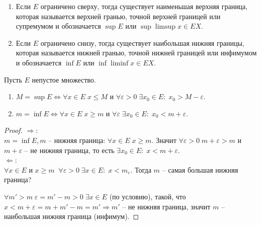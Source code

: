\begin{Definition}
\begin{enumerate}
\item Если $E$ ограничено сверху, тогда существует наименьшая верхняя граница, которая называется верхней гранью, точной верхней границей или супремумом и обозначается $\sup E$ или $\sup\limsup{x\in E}X.$
\item Если $E$ ограничено снизу, тогда существует наибольшая нижняя границы, которая называется нижней гранью, точной нижней границей или инфимумом и обозначается $\inf E$ или $\inf\liminf{x\in E}X.$
\end{enumerate}
\end{Definition}

\begin{Theorem}
Пусть $E$ непустое множество. 
\begin{enumerate}
\item $M=\sup E \Leftrightarrow \forall x\in E\; x\leq M$ и $\forall\varepsilon>0\; \exists x_0\in E: \; x_0>M-\varepsilon.$
\item $m=\inf E \Leftrightarrow \forall x\in E \; x\geq m$ и $\forall\varepsilon\; \exists x_0\in E: \; x_0<m+\varepsilon.$
\end{enumerate}
\end{Theorem}
\begin{proof}
$\Rightarrow:$\\
$m=\inf E, m$ -- нижняя граница: $\forall x\in E\; x\geq m.$ Значит $\forall\varepsilon>0\; m+\varepsilon>m$ и $m+\varepsilon$ -- не нижняя граница, то есть $\exists x_0\in E: \; x<m+\varepsilon.$\\
$\Leftarrow:$\\
$\forall x\in E$ и $x\geq m \;\; \forall\varepsilon>0\; \exists x\in E: \; x<m_\varepsilon.$ Тогда $m$ -- самая большая нижняя граница?
\par $\forall m'>m \; \varepsilon=m'-m>0 \; \exists x\in E$ (по условию), такой, что $x<m+\varepsilon = m+m'-m=m' \Rightarrow m'$ -- не нижняя граница, значит $m$ -- наибольшая нижняя граница (инфимум).
\end{proof}

